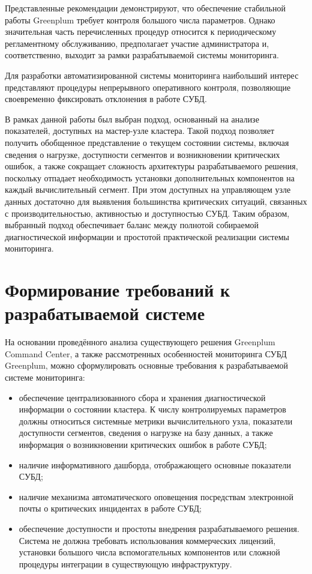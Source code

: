 Представленные рекомендации демонстрируют, что обеспечение стабильной работы Greenplum требует контроля большого числа параметров. Однако значительная часть перечисленных процедур относится к периодическому регламентному обслуживанию, предполагает участие администратора и, соответственно, выходит за рамки разрабатываемой системы мониторинга.

Для разработки автоматизированной системы мониторинга наибольший интерес представляют процедуры непрерывного оперативного контроля, позволяющие своевременно фиксировать отклонения в работе СУБД.

В рамках данной работы был выбран подход, основанный на анализе показателей, доступных на мастер-узле кластера. Такой подход позволяет получить обобщенное представление о текущем состоянии системы, включая сведения о нагрузке, доступности сегментов и возникновении критических ошибок, а также сокращает сложность архитектуры разрабатываемого решения, поскольку отпадает необходимость установки дополнительных компонентов на каждый вычислительный сегмент. При этом доступных на управляющем узле данных достаточно для выявления большинства критических ситуаций, связанных с производительностью, активностью и доступностью СУБД. Таким образом, выбранный подход обеспечивает баланс между полнотой собираемой диагностической информации и простотой практической реализации системы мониторинга.

\section{Формирование требований к разрабатываемой системе} \label{ch1:sec4}

На основании проведённого анализа существующего решения Greenplum Command Center, а также рассмотренных особенностей мониторинга СУБД Greenplum, можно сформулировать основные требования к разрабатываемой системе мониторинга:

\begin{itemize}
	\item обеспечение централизованного сбора и хранения диагностической информации о состоянии кластера. К числу контролируемых параметров должны относиться системные метрики вычислительного узла, показатели доступности сегментов, сведения о нагрузке на базу данных, а также информация о возникновении критических ошибок в работе СУБД;
	\item наличие информативного дашборда, отображающего основные показатели СУБД;
	\item наличие механизма автоматического оповещения посредствам электронной почты о критических инцидентах в работе СУБД;
	\item обеспечение доступности и простоты внедрения разрабатываемого решения. Система не должна требовать использования коммерческих лицензий, установки большого числа вспомогательных компонентов или сложной процедуры интеграции в существующую инфраструктуру.
\end{itemize}

